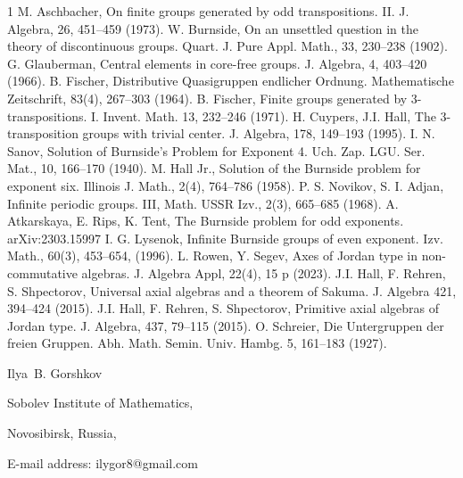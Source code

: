\documentclass[12pt]{article}
\newtheorem{lem}{Lemma}
\begin{document}



	  
	  
	  \begin{thebibliography}{1}
	   M. Aschbacher, On finite groups generated by odd transpositions. II. J. Algebra, 26, 451--459 (1973).	
	   W. Burnside, On an unsettled question in the theory of discontinuous groups. Quart. J. Pure Appl. Math., 33, 230--238 (1902).	
	   G. Glauberman, Central elements in core-free groups. J. Algebra, 4, 403--420 (1966).
	   B. Fischer, Distributive Quasigruppen endlicher Ordnung. Mathematische Zeitschrift, 83(4), 267--303 (1964).
	    B. Fischer, Finite groups generated by 3-transpositions. I. Invent. Math. 13, 232--246 (1971).
	     H. Cuypers, J.I. Hall, The 3-transposition groups with trivial center. J. Algebra, 178, 149--193 (1995).
	    I. N. Sanov, Solution of Burnside's Problem for Exponent 4. Uch. Zap. LGU. Ser. Mat., 10, 166--170 (1940).
	     M. Hall Jr., Solution of the Burnside problem for exponent six. Illinois J. Math., 2(4), 764--786 (1958).
	    P. S. Novikov, S. I. Adjan, Infinite periodic groups. III, Math. USSR Izv., 2(3), 665--685 (1968).
	    A. Atkarskaya, E. Rips, K. Tent, The Burnside problem for odd exponents. arXiv:2303.15997
	    I. G. Lysenok, Infinite Burnside groups
	   of even exponent. Izv. Math., 60(3), 453--654, (1996).
	    L. Rowen, Y. Segev,
	   Axes of Jordan type in non-commutative algebras.
	   J. Algebra Appl, 22(4), 15 p (2023). 
 J.I. Hall, F. Rehren, S. Shpectorov,
Universal axial algebras and a theorem of Sakuma. J. Algebra 421, 394--424 (2015).	   
	    J.I. Hall, F. Rehren, S. Shpectorov, Primitive axial algebras of Jordan type. J. Algebra, 437, 79--115 (2015).
	    O. Schreier, Die Untergruppen der freien Gruppen. Abh. Math. Semin. Univ. Hambg. 5, 161--183 (1927).
	   
	  \end{thebibliography}
      \bigskip

Ilya~B. Gorshkov

Sobolev Institute of Mathematics,

Novosibirsk, Russia,

E-mail address: ilygor8@gmail.com
\end{document}
